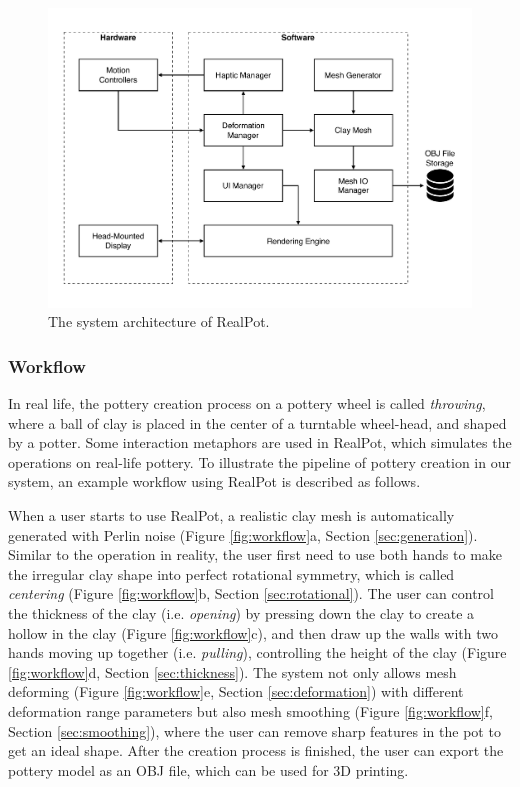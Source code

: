 \documentclass{svjour3}                     %
\begin{document}
\begin{figure}
\includegraphics[width=\textwidth]{fig2}
\caption{The system architecture of RealPot.}
\label{fig:arc}
\end{figure}



\subsubsection{Workflow}
\label{sec:workflow}
In real life, the pottery creation process on a pottery wheel is called \textit{throwing}, where a ball of clay is placed in the center of a turntable wheel-head, and shaped by a potter.
Some interaction metaphors are used in RealPot, which simulates the operations on real-life pottery.
To illustrate the pipeline of pottery creation in our system, an example workflow using RealPot is described as follows.

When a user starts to use RealPot, a realistic clay mesh is automatically generated with Perlin noise (Figure \ref{fig:workflow}a, Section \ref{sec:generation}). 
Similar to the operation in reality, the user first need to use both hands to make the irregular clay shape into perfect rotational symmetry, which is called \textit{centering} (Figure \ref{fig:workflow}b, Section \ref{sec:rotational}).
The user can control the thickness of the clay (i.e. \textit{opening}) by pressing down the clay to create a hollow in the clay (Figure \ref{fig:workflow}c), 
and then draw up the walls with two hands moving up together (i.e. \textit{pulling}), controlling the height of the clay (Figure \ref{fig:workflow}d, Section \ref{sec:thickness}).
The system not only allows mesh deforming (Figure \ref{fig:workflow}e, Section \ref{sec:deformation}) with different deformation range parameters but also mesh smoothing (Figure \ref{fig:workflow}f, Section \ref{sec:smoothing}), where the user can remove sharp features in the pot to get an ideal shape.
After the creation process is finished, the user can export the pottery model as an OBJ file, which can be used for 3D printing.
\end{document}
